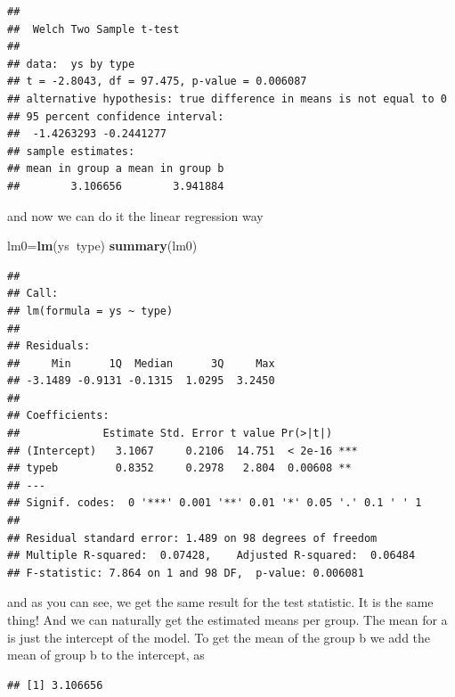 \documentclass[
]{book}
\newenvironment{Shaded}{\begin{snugshade}}{\end{snugshade}}
\newcommand{\CommentTok}[1]{\textcolor[rgb]{0.56,0.35,0.01}{\textit{#1}}}
\newcommand{\DecValTok}[1]{\textcolor[rgb]{0.00,0.00,0.81}{#1}}
\newcommand{\KeywordTok}[1]{\textcolor[rgb]{0.13,0.29,0.53}{\textbf{#1}}}
\newcommand{\NormalTok}[1]{#1}
\newcommand{\OperatorTok}[1]{\textcolor[rgb]{0.81,0.36,0.00}{\textbf{#1}}}
\begin{document}
\begin{verbatim}
## 
## 	Welch Two Sample t-test
## 
## data:  ys by type
## t = -2.8043, df = 97.475, p-value = 0.006087
## alternative hypothesis: true difference in means is not equal to 0
## 95 percent confidence interval:
##  -1.4263293 -0.2441277
## sample estimates:
## mean in group a mean in group b 
##        3.106656        3.941884
\end{verbatim}

and now we can do it the linear regression way

\begin{Shaded}
\begin{Highlighting}[]
\NormalTok{lm0=}\KeywordTok{lm}\NormalTok{(ys}\OperatorTok{~}\NormalTok{type)}
\KeywordTok{summary}\NormalTok{(lm0)}
\end{Highlighting}
\end{Shaded}

\begin{verbatim}
## 
## Call:
## lm(formula = ys ~ type)
## 
## Residuals:
##     Min      1Q  Median      3Q     Max 
## -3.1489 -0.9131 -0.1315  1.0295  3.2450 
## 
## Coefficients:
##             Estimate Std. Error t value Pr(>|t|)    
## (Intercept)   3.1067     0.2106  14.751  < 2e-16 ***
## typeb         0.8352     0.2978   2.804  0.00608 ** 
## ---
## Signif. codes:  0 '***' 0.001 '**' 0.01 '*' 0.05 '.' 0.1 ' ' 1
## 
## Residual standard error: 1.489 on 98 degrees of freedom
## Multiple R-squared:  0.07428,	Adjusted R-squared:  0.06484 
## F-statistic: 7.864 on 1 and 98 DF,  p-value: 0.006081
\end{verbatim}

and as you can see, we get the same result for the test statistic. It is the same thing! And we can naturally get the estimated means per group. The mean for a is just the intercept of the model. To get the mean of the group b we add the mean of group b to the intercept, as

\begin{Shaded}
\end{Shaded}

\begin{verbatim}
## [1] 3.106656
\end{verbatim}
\end{document}
